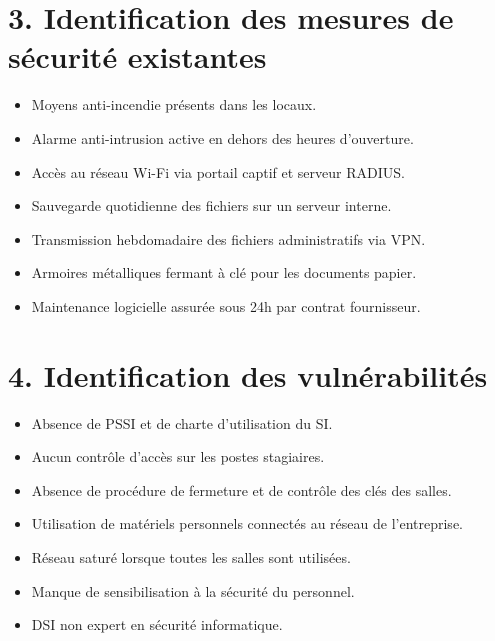 \documentclass[a4paper,12pt]{article}
\begin{document}
\section*{3. Identification des mesures de sécurité existantes}
\begin{itemize}
    \item Moyens anti-incendie présents dans les locaux.
    \item Alarme anti-intrusion active en dehors des heures d’ouverture.
    \item Accès au réseau Wi-Fi via portail captif et serveur RADIUS.
    \item Sauvegarde quotidienne des fichiers sur un serveur interne.
    \item Transmission hebdomadaire des fichiers administratifs via VPN.
    \item Armoires métalliques fermant à clé pour les documents papier.
    \item Maintenance logicielle assurée sous 24h par contrat fournisseur.
\end{itemize}

\section*{4. Identification des vulnérabilités}
\begin{itemize}
    \item Absence de PSSI et de charte d’utilisation du SI.
    \item Aucun contrôle d’accès sur les postes stagiaires.
    \item Absence de procédure de fermeture et de contrôle des clés des salles.
    \item Utilisation de matériels personnels connectés au réseau de l’entreprise.
    \item Réseau saturé lorsque toutes les salles sont utilisées.
    \item Manque de sensibilisation à la sécurité du personnel.
    \item DSI non expert en sécurité informatique.
\end{itemize}
\end{document}

